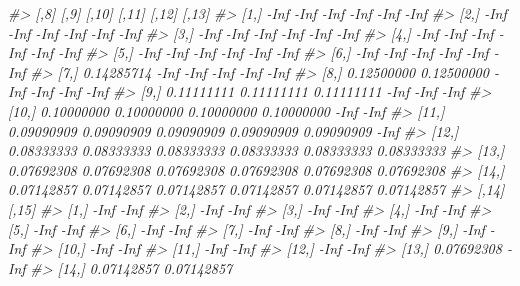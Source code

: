 \documentclass[
]{book}
\newenvironment{Shaded}{\begin{snugshade}}{\end{snugshade}}
\newcommand{\CommentTok}[1]{\textcolor[rgb]{0.56,0.35,0.01}{\textit{#1}}}
\begin{document}
\begin{Shaded}
\begin{Highlighting}[]
\CommentTok{\#\textgreater{}             [,8]       [,9]      [,10]      [,11]      [,12]      [,13]}
\CommentTok{\#\textgreater{}  [1,]       {-}Inf       {-}Inf       {-}Inf       {-}Inf       {-}Inf       {-}Inf}
\CommentTok{\#\textgreater{}  [2,]       {-}Inf       {-}Inf       {-}Inf       {-}Inf       {-}Inf       {-}Inf}
\CommentTok{\#\textgreater{}  [3,]       {-}Inf       {-}Inf       {-}Inf       {-}Inf       {-}Inf       {-}Inf}
\CommentTok{\#\textgreater{}  [4,]       {-}Inf       {-}Inf       {-}Inf       {-}Inf       {-}Inf       {-}Inf}
\CommentTok{\#\textgreater{}  [5,]       {-}Inf       {-}Inf       {-}Inf       {-}Inf       {-}Inf       {-}Inf}
\CommentTok{\#\textgreater{}  [6,]       {-}Inf       {-}Inf       {-}Inf       {-}Inf       {-}Inf       {-}Inf}
\CommentTok{\#\textgreater{}  [7,] 0.14285714       {-}Inf       {-}Inf       {-}Inf       {-}Inf       {-}Inf}
\CommentTok{\#\textgreater{}  [8,] 0.12500000 0.12500000       {-}Inf       {-}Inf       {-}Inf       {-}Inf}
\CommentTok{\#\textgreater{}  [9,] 0.11111111 0.11111111 0.11111111       {-}Inf       {-}Inf       {-}Inf}
\CommentTok{\#\textgreater{} [10,] 0.10000000 0.10000000 0.10000000 0.10000000       {-}Inf       {-}Inf}
\CommentTok{\#\textgreater{} [11,] 0.09090909 0.09090909 0.09090909 0.09090909 0.09090909       {-}Inf}
\CommentTok{\#\textgreater{} [12,] 0.08333333 0.08333333 0.08333333 0.08333333 0.08333333 0.08333333}
\CommentTok{\#\textgreater{} [13,] 0.07692308 0.07692308 0.07692308 0.07692308 0.07692308 0.07692308}
\CommentTok{\#\textgreater{} [14,] 0.07142857 0.07142857 0.07142857 0.07142857 0.07142857 0.07142857}
\CommentTok{\#\textgreater{}            [,14]      [,15]}
\CommentTok{\#\textgreater{}  [1,]       {-}Inf       {-}Inf}
\CommentTok{\#\textgreater{}  [2,]       {-}Inf       {-}Inf}
\CommentTok{\#\textgreater{}  [3,]       {-}Inf       {-}Inf}
\CommentTok{\#\textgreater{}  [4,]       {-}Inf       {-}Inf}
\CommentTok{\#\textgreater{}  [5,]       {-}Inf       {-}Inf}
\CommentTok{\#\textgreater{}  [6,]       {-}Inf       {-}Inf}
\CommentTok{\#\textgreater{}  [7,]       {-}Inf       {-}Inf}
\CommentTok{\#\textgreater{}  [8,]       {-}Inf       {-}Inf}
\CommentTok{\#\textgreater{}  [9,]       {-}Inf       {-}Inf}
\CommentTok{\#\textgreater{} [10,]       {-}Inf       {-}Inf}
\CommentTok{\#\textgreater{} [11,]       {-}Inf       {-}Inf}
\CommentTok{\#\textgreater{} [12,]       {-}Inf       {-}Inf}
\CommentTok{\#\textgreater{} [13,] 0.07692308       {-}Inf}
\CommentTok{\#\textgreater{} [14,] 0.07142857 0.07142857}
\end{Highlighting}
\end{Shaded}
\end{document}
